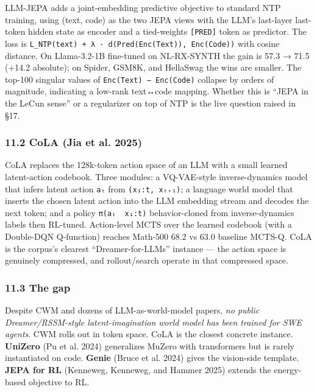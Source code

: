 \documentclass{article}
\begin{document}
LLM-JEPA adds a joint-embedding predictive objective to standard NTP
training, using (text, code) as the two JEPA views with the LLM's
last-layer last-token hidden state as encoder and a tied-weights
\texttt{{[}PRED{]}} token as predictor. The loss is
\texttt{L\_NTP(text)\ +\ λ\ ·\ d(Pred(Enc(Text)),\ Enc(Code))} with
cosine distance. On Llama-3.2-1B fine-tuned on NL-RX-SYNTH the gain is
57.3 → 71.5 (+14.2 absolute); on Spider, GSM8K, and HellaSwag the wins
are smaller. The top-100 singular values of
\texttt{Enc(Text)\ −\ Enc(Code)} collapse by orders of magnitude,
indicating a low-rank text↔code mapping. Whether this is ``JEPA in the
LeCun sense'' or a regularizer on top of NTP is the live question raised
in §17.

\hypertarget{cola-arxiv2503_21383}{%
\subsubsection{11.2 CoLA (Jia et al. 2025)}\label{cola-arxiv2503_21383}}

CoLA replaces the 128k-token action space of an LLM with a small learned
latent-action codebook. Three modules: a VQ-VAE-style inverse-dynamics
model that infers latent action \texttt{aₜ} from \texttt{(x₁:t,\ xₜ₊₁)};
a language world model that inserts the chosen latent action into the
LLM embedding stream and decodes the next token; and a policy
\texttt{π(aₜ\ \textbar{}\ x₁:t)} behavior-cloned from inverse-dynamics
labels then RL-tuned. Action-level MCTS over the learned codebook (with
a Double-DQN Q-function) reaches Math-500 68.2 vs 63.0 baseline MCTS-Q.
CoLA is the corpus's clearest ``Dreamer-for-LLMs'' instance --- the
action space is genuinely compressed, and rollout/search operate in that
compressed space.

\hypertarget{the-gap}{%
\subsubsection{11.3 The gap}\label{the-gap}}

Despite CWM and dozens of LLM-as-world-model papers, \emph{no public
Dreamer/RSSM-style latent-imagination world model has been trained for
SWE agents}. CWM rolls out in token space. CoLA is the closest concrete
instance. \textbf{UniZero} (Pu et al. 2024) generalizes MuZero with
transformers but is rarely instantiated on code. \textbf{Genie} (Bruce
et al. 2024) gives the vision-side template. \textbf{JEPA for RL}
(Kenneweg, Kenneweg, and Hammer 2025) extends the energy-based objective
to RL.
\end{document}
